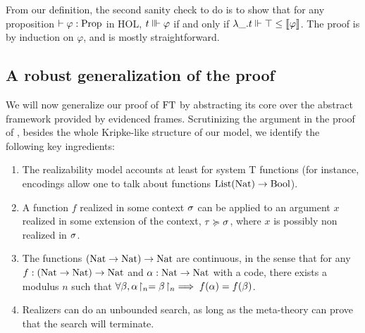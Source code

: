 \documentclass[a4paper,UKenglish,cleveref, autoref, thm-restate]{lipics-v2021}
\begin{document}


From our definition, the second sanity check to do is to show that for any proposition $\vdash\varphi : \mathrm{Prop}$ in HOL,
$t \Vvdash \varphi$ if and only if $\lambda\_.t \Vdash \top \leq \llbracket \varphi \rrbracket$.%
The proof is by induction on $\varphi$, and is mostly straightforward. %




\subsection{A robust generalization of the proof}
\label{s:generalization}


We will now generalize our proof of $\mathrm{FT}$ by abstracting its core over the
abstract framework provided by evidenced frames.
Scrutinizing the argument in the proof of ,
besides the whole Kripke-like structure of our model,
we identify the following key ingredients:
\begin{enumerate}
\item The realizability model accounts at least for system T functions (for instance,
encodings allow one to talk about functions $\mathrm{List}(\mathrm{Nat}) \to \mathrm{Bool}$).
\item A function $f$ realized in some context $\sigma$ can be applied to an argument $x$ realized in some extension of the context, $\tau \succcurlyeq \sigma$, where $x$ is possibly non realized in $\sigma$.
\item The functions $(\mathrm{Nat} \to \mathrm{Nat}) \to \mathrm{Nat}$ are continuous, in the sense that for any $f : (\mathrm{Nat} \to \mathrm{Nat}) \to \mathrm{Nat}$ and $\alpha : \mathrm{Nat} \to \mathrm{Nat}$ with a code, there exists a modulus $n$ such that $\forall \beta, {\alpha}\!\upharpoonright_{n} = {\beta}\!\upharpoonright_{n} \implies f(\alpha) = f(\beta)$.
\item Realizers can do an unbounded search,
as long as the meta-theory can prove that the search will terminate.
\end{enumerate}
\end{document}
